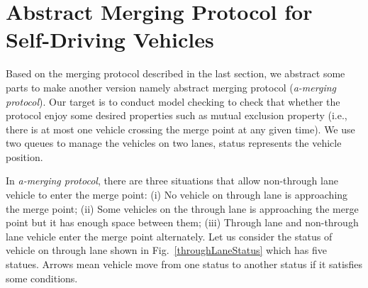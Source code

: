 \documentclass[10pt, conference, compsocconf]{IEEEtran}
\begin{document}


\section{Abstract Merging Protocol for Self-Driving Vehicles}
 \label{sect_reviproto}
Based on the merging protocol described in the last section, we abstract some parts to make another version namely abstract merging protocol ({\it a-merging protocol}).
Our target is to conduct model checking to check that whether the protocol enjoy some desired properties such as mutual exclusion property (i.e., there is at most one vehicle crossing the merge point at any given time).
We use two queues to manage the vehicles on two lanes, status represents the vehicle position.


In \textit{a-merging protocol}, there are three situations that allow non-through lane vehicle to enter the merge point: 
(i) No vehicle on through lane is approaching the merge point; 
(ii) Some vehicles on the through lane is approaching the merge point but it has enough space between them; 
(iii) Through lane and non-through lane vehicle enter the merge point alternately. 
Let us consider the status of vehicle on through lane shown in Fig.~\ref{throughLaneStatus} which has five statues. 
Arrows mean vehicle move from one status to another status if it satisfies some conditions.
\end{document}
